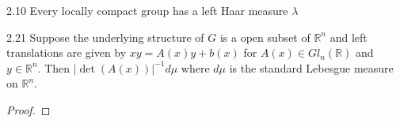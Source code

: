 \documentclass{article}
\newcommand{\R}{\mathbb{R}}
\newcommand{\abs}[1]{\left\lvert #1\right\rvert}
\begin{document}
\begin{claim}{2.10}\label{Claim 2.10.}
    Every locally compact group has a left Haar measure $\lambda$ 
\end{claim}

\bigskip

\begin{claim}{2.21}\label{Claim 2.21.}
    Suppose the underlying structure of $G$ is a open subset of $\R^n$ and left translations are given by $xy = A(x)y + b(x)$ for $A(x) \in Gl_n(\R)$ and $y \in \R^n$. Then $\abs{\det(A(x))}^{-1} d \mu$ where $d \mu$ is the standard Lebesgue measure on $\R^n$.        
\end{claim}
\begin{proof}
    
\end{proof}
\end{document}
